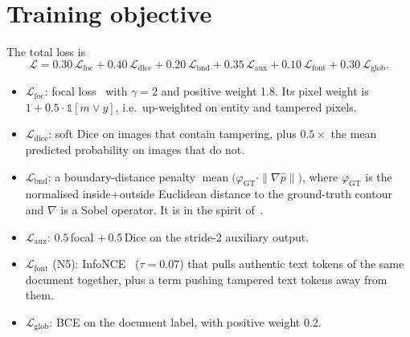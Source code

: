 \documentclass[10pt,a4paper]{article}
\begin{document}
\section{Training objective}\label{sec:loss}
The total loss is
\begin{equation}
\mathcal{L}=0.30\,\mathcal{L}_{\mathrm{foc}}+0.40\,\mathcal{L}_{\mathrm{dice}}+0.20\,\mathcal{L}_{\mathrm{bnd}}
+0.35\,\mathcal{L}_{\mathrm{aux}}+0.10\,\mathcal{L}_{\mathrm{font}}+0.30\,\mathcal{L}_{\mathrm{glob}} .
\end{equation}
\begin{itemize}
  \item $\mathcal{L}_{\mathrm{foc}}$: focal loss~\cite{focal} with $\gamma=2$ and positive
        weight 1.8. Its pixel weight is $1+0.5\cdot\mathbb{1}[m\lor y]$, i.e.\ up-weighted
        on entity and tampered pixels.
  \item $\mathcal{L}_{\mathrm{dice}}$: soft Dice on images that contain tampering, plus
        $0.5\times$ the mean predicted probability on images that do not.
  \item $\mathcal{L}_{\mathrm{bnd}}$: a boundary-distance penalty
        $\operatorname{mean}\bigl(\varphi_{\mathrm{GT}}\cdot\|\nabla\hat p\|\bigr)$, where
        $\varphi_{\mathrm{GT}}$ is the normalised inside+outside Euclidean distance to the
        ground-truth contour and $\nabla$ is a Sobel operator. It is in the spirit
        of~\cite{boundary}.
  \item $\mathcal{L}_{\mathrm{aux}}$: $0.5\,$focal $+\,0.5\,$Dice on the stride-2 auxiliary
        output.
  \item $\mathcal{L}_{\mathrm{font}}$ (N5): InfoNCE~\cite{infonce} ($\tau=0.07$) that pulls
        authentic text tokens of the same document together, plus a term pushing tampered
        text tokens away from them.
  \item $\mathcal{L}_{\mathrm{glob}}$: BCE on the document label, with positive weight 0.2.
\end{itemize}

\end{document}
